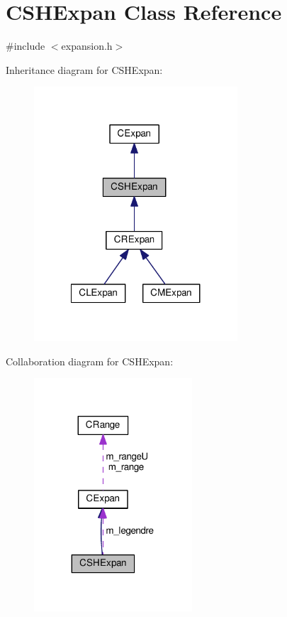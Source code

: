 \hypertarget{classCSHExpan}{\section{C\-S\-H\-Expan Class Reference}
\label{classCSHExpan}
}


{\ttfamily \#include $<$expansion.\-h$>$}



Inheritance diagram for C\-S\-H\-Expan\-:\nopagebreak
\begin{figure}[H]
\begin{center}
\leavevmode
\includegraphics[width=215pt]{classCSHExpan__inherit__graph}
\end{center}
\end{figure}


Collaboration diagram for C\-S\-H\-Expan\-:\nopagebreak
\begin{figure}[H]
\begin{center}
\leavevmode
\includegraphics[width=167pt]{classCSHExpan__coll__graph}
\end{center}
\end{figure}
